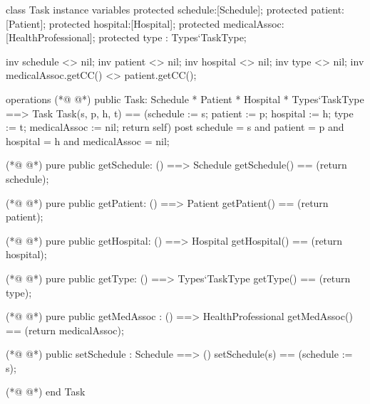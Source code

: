\begin{vdmpp}[breaklines=true]
class Task
instance variables
  protected schedule:[Schedule];
  protected patient:[Patient];
  protected hospital:[Hospital];
  protected medicalAssoc:[HealthProfessional];
  protected type : Types`TaskType;
  
  inv schedule <> nil;
  inv patient <> nil;
  inv hospital <> nil;
  inv type <> nil;
  inv medicalAssoc.getCC() <> patient.getCC();
  
operations
(*@
\label{Task:16}
@*)
 public Task: Schedule * Patient * Hospital * Types`TaskType ==> Task
  Task(s, p, h, t) == (schedule := s; patient := p; hospital := h; type := t; medicalAssoc := nil; return self)
 post schedule = s and patient = p and hospital = h and medicalAssoc = nil;
 
(*@
\label{getSchedule:20}
@*)
 pure public getSchedule: () ==> Schedule
  getSchedule() == (return schedule);
  
(*@
\label{getPatient:23}
@*)
 pure public getPatient: () ==> Patient
  getPatient() == (return patient);
  
(*@
\label{getHospital:26}
@*)
 pure public getHospital: () ==> Hospital
  getHospital() == (return hospital);
  
(*@
\label{getType:29}
@*)
 pure public getType: () ==> Types`TaskType
  getType() == (return type);
  
(*@
\label{getMedAssoc:32}
@*)
 pure public getMedAssoc : () ==> HealthProfessional
  getMedAssoc() == (return medicalAssoc);
  
(*@
\label{setSchedule:35}
@*)
 public setSchedule : Schedule ==> ()
  setSchedule(s) == (schedule := s);

(*@
\label{setPatient:38}
@*)
end Task
\end{vdmpp}
